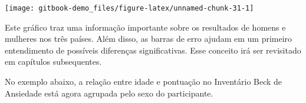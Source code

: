 \documentclass[
]{book}
\newenvironment{Shaded}{\begin{snugshade}}{\end{snugshade}}
\newcommand{\DataTypeTok}[1]{\textcolor[rgb]{0.13,0.29,0.53}{#1}}
\newcommand{\FloatTok}[1]{\textcolor[rgb]{0.00,0.00,0.81}{#1}}
\newcommand{\KeywordTok}[1]{\textcolor[rgb]{0.13,0.29,0.53}{\textbf{#1}}}
\newcommand{\NormalTok}[1]{#1}
\newcommand{\OperatorTok}[1]{\textcolor[rgb]{0.81,0.36,0.00}{\textbf{#1}}}
\newcommand{\StringTok}[1]{\textcolor[rgb]{0.31,0.60,0.02}{#1}}
\begin{document}
\begin{Shaded}
\end{Shaded}

\begin{center}\texttt{[image: gitbook-demo\_files/figure-latex/unnamed-chunk-31-1]} \end{center}

Este gráfico traz uma informação importante sobre os resultados de
homens e mulheres nos três países. Além disso, as barras de erro ajudam
em um primeiro entendimento de possíveis diferenças significativas. Esse
conceito irá ser revisitado em capítulos subsequentes.

No exemplo abaixo, a relação entre idade e pontuação no Inventário Beck
de Ansiedade está agora agrupada pelo sexo do participante.

\begin{Shaded}
\end{Shaded}
\end{document}
